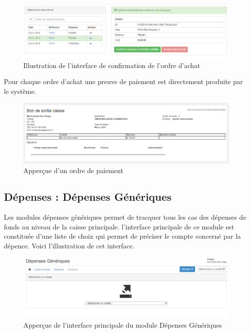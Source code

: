 \documentclass[12pt,a4paper]{report}
\begin{document}
\begin{figure}[h]
\begin{center}
\includegraphics[width=14cm]{pic/ConfOrdreAchat.png}
\end{center}
\caption{Illustration de l'interface de confirmation de l'ordre d'achat}
\label{Illustration de l'interface de confirmation de l'ordre d'achat}
\end{figure}

Pour chaque ordre d'achat une preuve de paiement est directement produite par le système.

\begin{figure}[h]
\begin{center}
\includegraphics[width=14cm]{pic/PreuvePaiement.png}
\end{center}
\caption{Apperçue d'un ordre de paiement}
\label{Apperçue d'un ordre de paiement}
\end{figure}

\subsection{Dépenses : Dépenses Génériques}
Les modules dépenses génériques permet de tracquer tous les cas des dépenses de fonds au niveau de la caisse principale. l'interface principale de ce module est constituée d'une liste de choix qui permet de préciser le compte concerné par la dépence.
Voici l'illustration de cet interface.

\begin{figure}[h]
\begin{center}
\includegraphics[width=14cm]{pic/DepenseGen.png}
\end{center}
\caption{Apperçue de l'interface principale du module Dépenses Génériques}
\label{Apperçue de l'interface principale du module Dépenses Génériques}
\end{figure}
\end{document}
